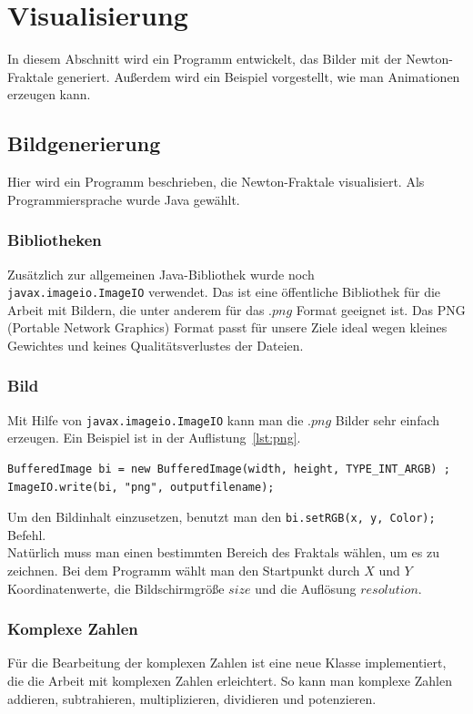 \documentclass[a4paper,12pt]{llncs}
\numberwithin{equation}{section}
\begin{document}
\section{Visualisierung}\label{sec:vis}
In diesem Abschnitt wird ein Programm entwickelt, das Bilder mit der Newton-Fraktale generiert.
Außerdem wird ein Beispiel vorgestellt, wie man Animationen erzeugen kann.

\subsection{Bildgenerierung}\label{subs:vis:bild}
Hier wird ein Programm beschrieben, die Newton-Fraktale visualisiert.
Als Programmiersprache wurde Java gewählt.

\subsubsection{Bibliotheken}
Zusätzlich zur allgemeinen Java-Bibliothek wurde noch\\ \verb|javax.imageio.ImageIO| verwendet.
Das ist eine öffentliche Bibliothek für die Arbeit mit Bildern, die unter anderem für das .$png$ Format geeignet ist.
Das PNG (Portable Network Graphics) Format passt für unsere Ziele ideal wegen kleines Gewichtes und keines Qualitätsverlustes der Dateien.

\subsubsection{Bild}
Mit Hilfe von \verb|javax.imageio.ImageIO| kann man die .$png$ Bilder sehr einfach erzeugen. 
Ein Beispiel ist in der Auflistung~\ref{lst:png}.
\begin{lstlisting}[float,caption=Ein Beispiel für die PNG Generierung, label=lst:png,captionpos=b]
BufferedImage bi = new BufferedImage(width, height, TYPE_INT_ARGB) ;
ImageIO.write(bi, "png", outputfilename);
\end{lstlisting}
Um den Bildinhalt einzusetzen, benutzt man den \verb|bi.setRGB(x, y, Color);| Befehl.\\
Natürlich muss man einen bestimmten Bereich des Fraktals wählen, um es zu zeichnen. 
Bei dem Programm wählt man den Startpunkt durch $X$ und $Y$ Koordinatenwerte, die Bildschirmgröße $size$ und die Auflösung $resolution$. 

\subsubsection{Komplexe Zahlen}
Für die Bearbeitung der komplexen Zahlen ist eine neue Klasse implementiert, die die Arbeit mit komplexen Zahlen erleichtert. 
So kann man komplexe Zahlen addieren, subtrahieren, multiplizieren, dividieren und potenzieren.
\end{document}
